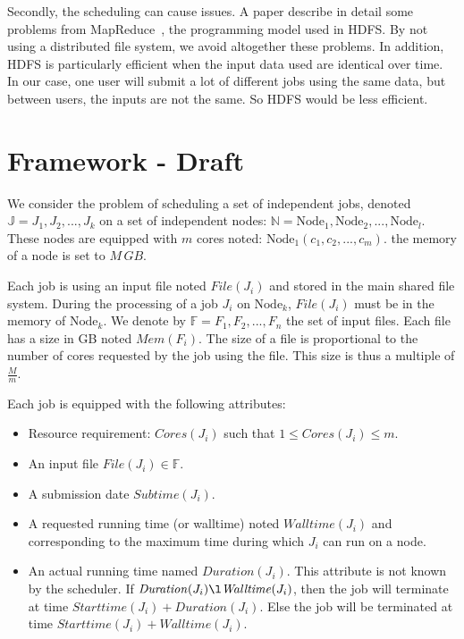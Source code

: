 \documentclass[conference,10pt]{IEEEtran}
\newcommand{\Node}[1]{\ensuremath{\mathrm{Node}_{#1}}\xspace}
\newcommand{\file}{\ensuremath{\mathit{File}}\xspace}
\newcommand{\memory}{\ensuremath{\mathit{Mem}}\xspace}
\newcommand{\duration}{\mathit{Duration}\xspace}
\newcommand{\core}{\mathit{Cores}\xspace}
\newcommand{\submissiontime}{\mathit{Subtime}\xspace}
\newcommand{\walltime}{\mathit{Walltime}\xspace}
\newcommand{\start}{\mathit{Starttime}\xspace}
\newcommand{\fileset}{\ensuremath{\mathbb{F}}\xspace}
\newcommand{\jobset}{\ensuremath{\mathbb{J}}\xspace}
\newcommand{\nodeset}{\ensuremath{\mathbb{N}}\xspace}
\begin{document}
Secondly, the scheduling can cause issues. A paper describe in detail some problems from
MapReduce~\cite{issue_with_hdfs}, the programming model used in HDFS.
By not using a distributed file system, we avoid altogether these problems. 
In addition, HDFS is particularly efficient when the input data used are identical over time.
In our case, one user will submit a lot of different jobs using the same data, but between users,
the inputs are not the same. So HDFS would be less efficient.

\section{Framework - Draft}\label{sec.framework}

We consider the problem of scheduling a set of independent jobs,
denoted $\jobset = {J_1, J_2, ..., J_k}$ on a set of independent nodes:
$\nodeset = {\Node{1}, \Node{2}, ..., \Node{l}}$.
These nodes are equipped with $m$ cores noted: $\Node{1}(c_1, c_2, ..., c_m)$.
the memory of a node is set to $M\,GB$.

Each job is using an input file noted $\file(J_i)$ and
stored in the main shared file system.
During the processing of a job $J_i$ on $\Node{k}$,
$\file(J_i)$ must be in the memory of $\Node{k}$. 
We denote by $\fileset = F_1, F_2, ..., F_n$ the set of input files.
Each file has a size in GB noted $\memory(F_i)$.
The size of a file is proportional to the number of cores requested by the job using the file.
This size is thus a multiple of $\frac{M}{m}$.

Each job is equipped with the following attributes:
\begin{itemize}
	\item Resource requirement: $\core(J_i)$ such that $1 \leq \core(J_i) \leq m$.
	\item An input file $\file(J_i) \in \fileset$.
	\item A submission date $\submissiontime(J_i)$.
	\item A requested running time (or walltime) noted $\walltime(J_i)$ and corresponding to
	the maximum time during which $J_i$ can run on a node.
	\item An actual running time named $\duration(J_i)$. This attribute is not known by
	the scheduler. If $\duration(J_i) \l \walltime(J_i)$, then the job will terminate at
	time $\start(J_i) + \duration(J_i)$. 
	Else the job will be terminated at time $\start(J_i) + \walltime(J_i)$.
\end{itemize}
\end{document}
